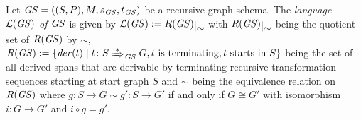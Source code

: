 \begin{definition}
\label{def:sec-compl-software-trans:lang_rec}
Let $\mathit{GS}=((S,P),M,s_\mathit{GS},t_\mathit{GS})$ be a recursive graph schema.
The \emph{language $\mathcal{L}(\mathit{GS})$ of $\mathit{GS}$} is given by $\Lang(\GS):=\quotient{R(\GS)}{\sim}$ with $\quotient{R(\GS)}{\sim}$ being the quotient set of $R(\mathit{GS})$ by $\sim$, $R(\GS):=\{\der(t) \mid t\colon S \Trans{*}_\GS G, t \text{ is terminating}, t \text{ starts in }S\}$ being the set of all derived spans that are derivable by terminating recursive transformation sequences starting at start graph $S$ and $\sim$ being the equivalence relation on $R(\mathit{GS})$ where $g\colon S \to G \sim g'\colon S \to G'$ if and only if $G \cong G'$ with isomorphism $i\colon G \to G'$ and $i \circ g = g'$.
\envEndMarker
\end{definition}

